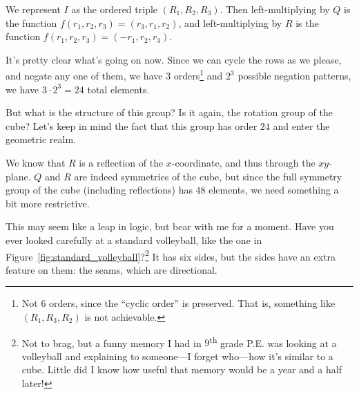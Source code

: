 \documentclass[../key.tex]{subfiles}
\begin{document}
We represent $I$ as the ordered triple $(R_1,R_2,R_3)$. Then left-multiplying by $Q$ is the function $f(r_1,r_2,r_3)=(r_3,r_1,r_2)$, and left-multiplying by $R$ is the function $f(r_1,r_2,r_3)=(-r_1,r_2,r_3)$.

It's pretty clear what's going on now. Since we can cycle the rows as we please, and negate any one of them, we have $3$ orders\footnote{Not $6$ orders, since the ``cyclic order'' is preserved. That is, something like $(R_1,R_3,R_2)$ is not achievable.} and $2^3$ possible negation patterns, we have $3\cdot 2^3 = 24$ total elements.

But what is the structure of this group? Is it again, the rotation group of the cube? Let's keep in mind the fact that this group has order $24$ and enter the geometric realm.

We know that $R$ is a reflection of the $x$-coordinate, and thus through the $xy$-plane. $Q$ and $R$ are indeed symmetries of the cube, but since the full symmetry group of the cube (including reflections) has $48$ elements, we need something a bit more restrictive.

This may seem like a leap in logic, but bear with me for a moment. Have you ever looked carefully at a standard volleyball, like the one in Figure~\ref{fig:standard_volleyball}?\footnote{Not to brag, but a funny memory I had in $9$\textsuperscript{th} grade P.E. was looking at a volleyball and explaining to someone---I forget who---how it's similar to a cube. Little did I know how useful that memory would be a year and a half later!} It has six sides, but the sides have an extra feature on them: the seams, which are directional.
\end{document}
